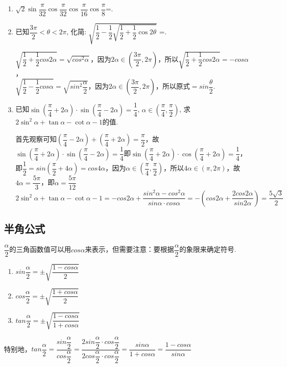 \begin{enumerate}
    \item $\sqrt{2}\sin\dfrac{\pi}{32}\cos\dfrac{\pi}{32}\cos\dfrac{\pi}{16}\cos\dfrac{\pi}{8}$=. 

    \item 已知$\dfrac{3\pi}{2}<\theta<2\pi$, 化简: $\sqrt{\dfrac{1}{2}-\dfrac{1}{2}\sqrt{\dfrac{1}{2}+\dfrac{1}{2}\cos2\theta}}$ =.         
    \begin{jieda}
        $\sqrt{\dfrac{1}{2}+\dfrac{1}{2}cos2\alpha} = \sqrt{cos^2\alpha}$，因为$2\alpha \in (\dfrac{3\pi}{2}, 2\pi)$，所以$\sqrt{\dfrac{1}{2}+\dfrac{1}{2}cos2\alpha} = -cos\alpha$，\\
        $\sqrt{\dfrac{1}{2}-\dfrac{1}{2}cos\alpha} = \sqrt{sin^2\dfrac{\alpha}{2}}$，因为$2\alpha \in (\dfrac{3\pi}{2}, 2\pi)$，所以原式$=sin\dfrac{\theta}{2}$.
    \end{jieda}
    
    \item 已知$\sin\left(\dfrac{\pi}{4}+2\alpha\right)\cdot\sin\left(\dfrac{\pi}{4}-2\alpha\right)=\dfrac{1}{4}$, $\alpha\in\left(\dfrac{\pi}{4},\dfrac{\pi}{2}\right)$, 
    求$2\sin^2\alpha+\tan\alpha-\cot\alpha-1$的值. 
    \begin{jieda}
        首先观察可知$\left(\dfrac{\pi}{4}-2\alpha\right) + \left(\dfrac{\pi}{4}+2\alpha\right) = \dfrac{\pi}{2}$，故$\sin\left(\dfrac{\pi}{4}+2\alpha\right)\cdot\sin\left(\dfrac{\pi}{4}-2\alpha\right)=\dfrac{1}{4}$即$\sin\left(\dfrac{\pi}{4}+2\alpha\right)\cdot\cos\left(\dfrac{\pi}{4}+2\alpha\right)=\dfrac{1}{4}$，即$\dfrac{1}{2} = sin\left(\dfrac{\pi}{2} + 4\alpha \right) = cos4\alpha$，因为$\alpha \in \left(\dfrac{\pi}{4},\dfrac{\pi}{2}\right)$，所以$4\alpha \in \left(\pi, 2\pi\right)$，故$4\alpha = \dfrac{5\pi}{3}$，即$\alpha = \dfrac{5\pi}{12}$ \\
        $2\sin^2\alpha+\tan\alpha-\cot\alpha-1 = -cos2\alpha + \dfrac{sin^2\alpha - cos^2\alpha}{sin\alpha \cdot cos\alpha} = -\left(cos2\alpha + \dfrac{2cos2\alpha}{sin2\alpha}\right) = \dfrac{5\sqrt{3}}{2}$
    \end{jieda}
\end{enumerate}

\subsection*{半角公式}
$\dfrac{\alpha}{2}$的三角函数值可以用$cos\alpha$来表示，但需要注意：要根据$\dfrac{\alpha}{2}$的象限来确定符号.
\begin{enumerate}
    \item $sin\dfrac{\alpha}{2} = \pm \sqrt{\dfrac{1-cos\alpha}{2}}$
    \item $cos\dfrac{\alpha}{2} = \pm \sqrt{\dfrac{1+cos\alpha}{2}}$
    \item $tan\dfrac{\alpha}{2} = \pm \sqrt{\dfrac{1-cos\alpha}{1+cos\alpha}}$
\end{enumerate}
特别地，$tan\dfrac{\alpha}{2} = \dfrac{sin\dfrac{\alpha}{2}}{cos\dfrac{\alpha}{2}} = \dfrac{2sin\dfrac{\alpha}{2} \cdot cos\dfrac{\alpha}{2}}{2cos\dfrac{\alpha}{2} \cdot cos\dfrac{\alpha}{2}} = \dfrac{sin\alpha}{1+cos\alpha} = \dfrac{1-cos\alpha}{sin\alpha}$

